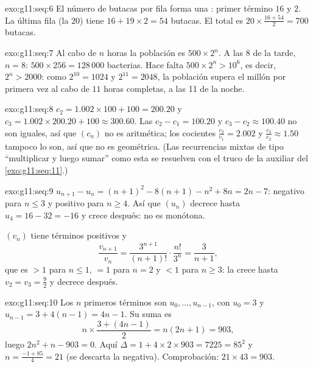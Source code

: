 \begin{solution}{exo:g11:seq:6}
El número de butacas por fila forma una : primer
término $16$ y  $2$. La última fila (la $20$) tiene
$16 + 19 \times 2 = 54$ butacas. El total es
$20 \times \frac{16 + 54}{2} = 700$ butacas.
\end{solution}

\begin{solution}{exo:g11:seq:7}
Al cabo de $n$ horas la población es $500 \times 2^n$. A las 8 de la
tarde, $n = 8$: $500 \times 256 = 128\,000$ bacterias. Hace falta
$500 \times 2^n > 10^6$, es decir, $2^n > 2000$: como $2^{10} = 1024$ y
$2^{11} = 2048$, la población supera el millón por primera vez al cabo de
$11$ horas completas, a las 11 de la noche.
\end{solution}

\begin{solution}{exo:g11:seq:8}
$c_2 = 1.002 \times 100 + 100 = 200.20$ y
$c_3 = 1.002 \times 200.20 + 100 \approx 300.60$. Las 
$c_2 - c_1 = 100.20$ y $c_3 - c_2 \approx 100.40$ no son iguales, así que
$(c_n)$ no es aritmética; los cocientes $\frac{c_2}{c_1} = 2.002$ y
$\frac{c_3}{c_2} \approx 1.50$ tampoco lo son, así que no es geométrica.
(Las recurrencias mixtas de tipo ``multiplicar y luego sumar'' como esta
se resuelven con el truco de la  auxiliar del
\cref{exo:g11:seq:11}.)
\end{solution}

\begin{solution}{exo:g11:seq:9}
$u_{n+1} - u_n = (n+1)^2 - 8(n+1) - n^2 + 8n = 2n - 7$: negativo para
$n \leq 3$ y positivo para $n \geq 4$. Así que $(u_n)$ decrece hasta
$u_4 = 16 - 32 = -16$ y crece después: no es monótona.

$(v_n)$ tiene términos positivos y
\[
\frac{v_{n+1}}{v_n} = \frac{3^{n+1}}{(n+1)!} \cdot \frac{n!}{3^n}
= \frac{3}{n+1},
\]
que es $> 1$ para $n \leq 1$, $= 1$ para $n = 2$ y $< 1$ para $n \geq 3$:
la  crece hasta $v_2 = v_3 = \frac92$ y decrece después.
\end{solution}

\begin{solution}{exo:g11:seq:10}
Los $n$ primeros términos son $u_0, \dots, u_{n-1}$, con $u_0 = 3$ y
$u_{n-1} = 3 + 4(n-1) = 4n - 1$. Su suma es
\[
n \times \frac{3 + (4n-1)}{2} = n(2n + 1) = 903,
\]
luego $2n^2 + n - 903 = 0$. Aquí
$\Delta = 1 + 4 \times 2 \times 903 = 7225 = 85^2$ y
$n = \frac{-1 + 85}{4} = 21$ (se descarta la  negativa).
Comprobación: $21 \times 43 = 903$.
\end{solution}

